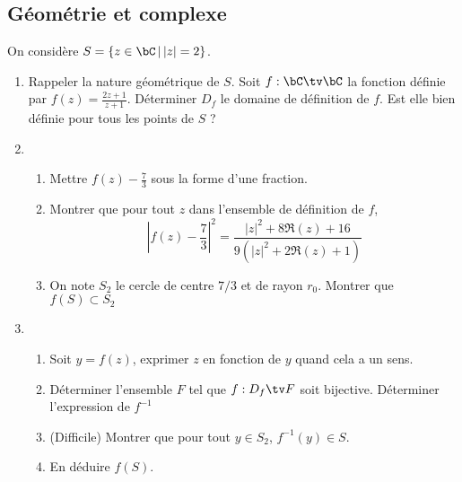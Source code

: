 \subsection{Géométrie et complexe  }


\begin{exercice}
On considère $ S= \{ z\in \bC\, | \, |z|=2\}$.
\begin{enumerate}
\item Rappeler la nature géométrique de $S$.
Soit $f : \bC \tv \bC $ la fonction définie par $f(z) =\frac{2z +1}{z+1}$. Déterminer $D_f$ le domaine de définition de $f$. Est elle bien définie pour tous les points de $S$ ? 
\item 
\begin{enumerate}
\item Mettre $f(z) -\frac{7}{3}$ sous la forme d'une fraction. 
\item Montrer que pour tout $z$ dans l'ensemble de définition de $f$, $$\left| f(z) -\frac{7}{3}\right|^2 = \frac{|z|^2 +8\Re(z) +16 }{9 (|z|^2 +2\Re(z) +1)}$$
\item On note $S_2$ le cercle de centre $7/3$ et de rayon $r_0$. Montrer que $f(S) \subset S_2$
\end{enumerate}
\item
\begin{enumerate}
\item  Soit $y =f(z)$, exprimer $z$ en fonction de $y$ quand cela a un sens. 
\item Déterminer l'ensemble $F$ tel que $f : D_f \tv F$ soit bijective. Déterminer l'expression de $f^{-1}$ 
\item (Difficile) Montrer que pour tout $y\in S_2$, $f^{-1}(y) \in S$. 
\item En déduire $f(S).$ 
\end{enumerate}

\end{enumerate}
\end{exercice}

